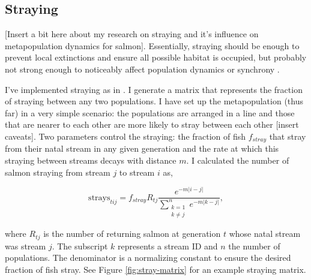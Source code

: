 \documentclass[12pt]{article}
\begin{document}
\subsection{Straying}

{[}Insert a bit here about my research on straying and it's influence on
metapopulation dynamics for salmon{]}. Essentially, straying should be
enough to prevent local extinctions and ensure all possible habitat is
occupied, but probably not strong enough to noticeably affect population
dynamics or synchrony \citep{Schtickzelle2007}.

I've implemented straying as in \citet{Cooper1999}. I generate a matrix
that represents the fraction of straying between any two populations. I
have set up the metapopulation (thus far) in a very simple scenario: the
populations are arranged in a line and those that are nearer to each
other are more likely to stray between each other {[}insert caveats{]}.
Two parameters control the straying: the fraction of fish $f_{stray}$
that stray from their natal stream in any given generation and the rate
at which this straying between streams decays with distance $m$. I
calculated the number of salmon straying from stream $j$ to stream $i$
as,

\begin{equation}
  \mathrm{strays}_{tij} = f_{stray} R_{tj} \frac{e^{-m \lvert i-j \rvert }}{\displaystyle\sum\limits_{\substack{k = 1 \\
  k \neq j}}^{n} e^{-m \lvert k-j \rvert }},
\end{equation}

\noindent
where $R_{tj}$ is the number of returning salmon at generation $t$ whose
natal stream was stream $j$. The subscript $k$ represents a stream ID
and $n$ the number of populations. The denominator is a normalizing
constant to ensure the desired fraction of fish stray. See Figure
\ref{fig:stray-matrix} for an example straying matrix.
\end{document}
